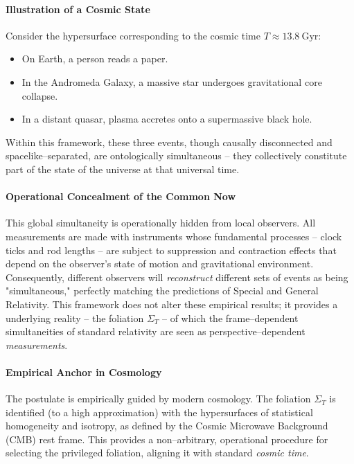\documentclass[12pt]{article}
\theoremstyle{plain}
\begin{document}
\paragraph{Illustration of a Cosmic State}
Consider the hypersurface corresponding to the cosmic time $T \approx 13.8~\mathrm{Gyr}$:
\begin{itemize}\itemsep2pt
\item On Earth, a person reads a paper.
\item In the Andromeda Galaxy, a massive star undergoes gravitational core collapse.
\item In a distant quasar, plasma accretes onto a supermassive black hole.
\end{itemize}
Within this framework, these three events, though causally disconnected and spacelike–separated, are ontologically simultaneous – they collectively constitute part of the state of the universe at that universal time.

\paragraph{Operational Concealment of the Common Now}
This global simultaneity is operationally hidden from local observers. All measurements are made with instruments whose fundamental processes – clock ticks and rod lengths – are subject to suppression and contraction effects that depend on the observer's state of motion and gravitational environment. Consequently, different observers will \emph{reconstruct} different sets of events as being "simultaneous," perfectly matching the predictions of Special and General Relativity. This framework does not alter these empirical results; it provides a underlying reality – the foliation ${\Sigma_T}$ – of which the frame–dependent simultaneities of standard relativity are seen as perspective–dependent \emph{measurements}.

\paragraph{Empirical Anchor in Cosmology}
The postulate is empirically guided by modern cosmology. The foliation $\Sigma_T$ is identified (to a high approximation) with the hypersurfaces of statistical homogeneity and isotropy, as defined by the Cosmic Microwave Background (CMB) rest frame. This provides a non–arbitrary, operational procedure for selecting the privileged foliation, aligning it with standard \emph{cosmic time}.
\end{document}
